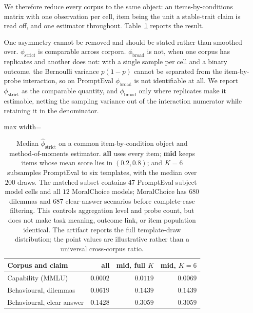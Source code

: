 \documentclass[11pt]{article}
\begin{document}
We therefore reduce every corpus to the same object: an items-by-conditions
matrix with one observation per cell, item being the unit a stable-trait claim
is read off, and one estimator throughout. Table~\ref{tab:harmonised} reports the
result.

One asymmetry cannot be removed and should be stated rather than smoothed over.
$\phi_{\text{strict}}$ is comparable across corpora. $\phi_{\text{broad}}$ is not,
when one corpus has replicates and another does not: with a single sample per
cell and a binary outcome, the Bernoulli variance $p(1-p)$ cannot be separated
from the item-by-probe interaction, so on PromptEval $\phi_{\text{broad}}$ is not
identifiable at all. We report $\phi_{\text{strict}}$ as the comparable quantity,
and $\phi_{\text{broad}}$ only where replicates make it estimable, netting the
sampling variance out of the interaction numerator while retaining it in the
denominator.

\begin{table}[H]
\centering
\scriptsize
\setlength{\tabcolsep}{2.5pt}
\begin{adjustbox}{max width=\columnwidth}
\begin{tabular}{@{}lrrr@{}}
\toprule
\rowcolor{cardblue!55}
\textbf{Corpus and claim} & \textbf{all} & \textbf{mid, full $K$} & \textbf{mid, $K=6$} \\
\midrule
Capability (MMLU)          & $0.0002$ & $0.0119$ & $0.0069$ \\
\rowcolor{leafbg}
Behavioural, dilemmas      & $0.0619$ & $0.1439$ & $0.1439$ \\
Behavioural, clear answer  & $0.1428$ & $0.3059$ & $0.3059$ \\
\bottomrule
\end{tabular}
\end{adjustbox}
\caption{Median $\hat\phi_{\text{strict}}$ on a common item-by-condition
object and method-of-moments estimator. \textbf{all} uses every item;
\textbf{mid} keeps items whose mean score lies in $(0.2,0.8)$; and $K=6$
subsamples PromptEval to six templates, with the median over $200$ draws.
The matched subset contains $47$ PromptEval subject-model cells and all $12$
MoralChoice models; MoralChoice has $680$ dilemmas and $687$ clear-answer
scenarios before complete-case filtering.
This controls aggregation level and probe count, but does not make task meaning,
outcome link, or item population identical. The artifact reports the full
template-draw distribution; the point values are illustrative rather than a
universal cross-corpus ratio.}
\label{tab:harmonised}
\end{table}
\end{document}
